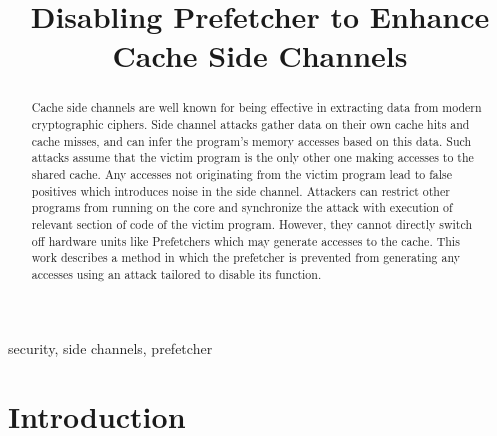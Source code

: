 \documentclass[conference]{IEEEtran}
\begin{document}
\title{Disabling Prefetcher to Enhance Cache Side Channels}

\author{
}

\maketitle

\begin{abstract}
Cache side channels are well known for being effective
in extracting data from modern cryptographic ciphers.
Side channel attacks gather data on their own cache hits and cache misses,
and can infer the program's memory accesses based on this data.
Such attacks assume that the victim program is the only other one making accesses
to the shared cache. Any accesses not originating from the victim program
lead to false positives which introduces noise in the side channel.
Attackers can restrict other programs from running on the core and
synchronize the attack with execution of relevant section of code of the
victim program. However, they cannot directly switch off hardware units
like Prefetchers which may generate accesses to the cache.
This work describes a method in which the prefetcher is prevented
from generating any accesses using an attack tailored to disable its
function.
\end{abstract}

\begin{IEEEkeywords}
security, side channels, prefetcher
\end{IEEEkeywords}

\section{Introduction}
\end{document}
